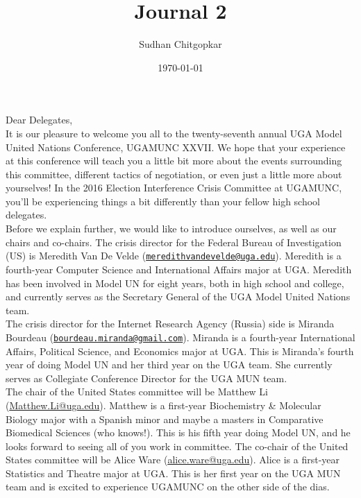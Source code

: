 \documentclass[10pt, letterpaper]{article}
\title{Journal 2}
\author{Sudhan Chitgopkar}
\date{\today}
\begin{document}
Dear Delegates, \\

It is our pleasure to welcome you all to the twenty-seventh annual UGA
Model United Nations Conference, UGAMUNC XXVII. We hope that your
experience at this conference will teach you a little bit more about the
events surrounding this committee, different tactics of negotiation, or
even just a little more about yourselves! In the 2016 Election
Interference Crisis Committee at UGAMUNC, you'll be experiencing things
a bit differently than your fellow high school delegates. \\

Before we explain further, we would like to introduce ourselves, as well
as our chairs and co-chairs. The crisis director for the Federal Bureau
of Investigation (US) is Meredith Van De Velde
(\texttt{\href{mailto:meredithvandevelde@uga.edu}{meredithvandevelde@uga.edu}}).
Meredith is a fourth-year Computer Science and International Affairs
major at UGA. Meredith has been involved in Model UN for eight years,
both in high school and college, and currently serves as the Secretary
General of the UGA Model United Nations team. \\

The crisis director for the Internet Research Agency (Russia) side is
Miranda Bourdeau \newline
(\texttt{\href{mailto:bourdeau.miranda@gmail.com}{bourdeau.miranda@gmail.com}}).
Miranda is a fourth-year International Affairs, Political Science, and
Economics major at UGA. This is Miranda's fourth year of doing Model UN
and her third year on the UGA team. She currently serves as Collegiate
Conference Director for the UGA MUN team. \\

The chair of the United States committee will be Matthew Li
(\href{mailto:Matthew.Li@uga.edu}{\underline{Matthew.Li@uga.edu}}).
Matthew is a first-year Biochemistry \& Molecular Biology major with a
Spanish minor and maybe a masters in Comparative Biomedical Sciences
(who knows!). This is his fifth year doing Model UN, and he looks
forward to seeing all of you work in committee. The co-chair of the
United States committee will be Alice Ware
(\href{mailto:alice.ware@uga.edu}{\underline{alice.ware@uga.edu}}).
Alice is a first-year Statistics and Theatre major at UGA. This is her
first year on the UGA MUN team and is excited to experience UGAMUNC on
the other side of the dias. \\
\end{document}
